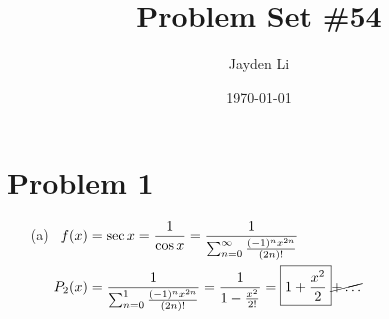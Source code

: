 \documentclass[preview, margin=0.6in]{standalone}
\title{\vspace*{-40pt}Problem Set \#54}
\author{Jayden Li}
\date{\today}
\newcommand*{\problem}[1]{\section*{Problem #1}}
\begin{document}
\fontsize{12pt}{12pt}\selectfont
\setlength{\abovedisplayskip}{\abovedisplayskip/2}
\setlength{\belowdisplayskip}{\belowdisplayskip/2}
\setlength{\parindent}{0pt}
\setlength{\parskip}{2ex plus 0.5ex minus 0.2ex}
\setlength{\cellspacetoplimit}{8pt}
\setlength{\cellspacebottomlimit}{8pt}

\maketitle

\problem{1}
\begin{itemize}
	\item[(a)]
		$\begin{aligned}[t]
		    f(x)
			&=\sec x
			=\frac{1}{\cos x}
			=\frac{1}{\sum_{n=0}^{\infty}\frac{(-1)^n x^{2n}}{(2n)!}} \\
			P_2(x)
			&=\frac{1}{\sum_{n=0}^{1}\frac{(-1)^n x^{2n}}{(2n)!}}
			=\frac{1}{1-\frac{x^2}{2!}}
			=\boxed{1+\frac{x^2}{2}}\cancel{+\ldots}
		\end{aligned}$
\end{itemize}
\end{document}
